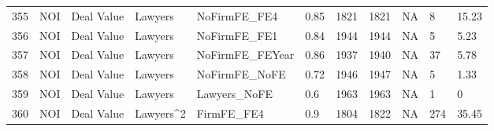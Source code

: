 \documentclass{article}
\begin{document}
\begin{table}[H]
\begin{tabular}{rllllllllll}
  355 & NOI & Deal Value & Lawyers & NoFirmFE\_FE4 & 0.85 & 1821 & 1821 & NA & 8 & 15.23 \\ 
  356 & NOI & Deal Value & Lawyers & NoFirmFE\_FE1 & 0.84 & 1944 & 1944 & NA & 5 & 5.23 \\ 
  357 & NOI & Deal Value & Lawyers & NoFirmFE\_FEYear & 0.86 & 1937 & 1940 & NA & 37 & 5.78 \\ 
  358 & NOI & Deal Value & Lawyers & NoFirmFE\_NoFE & 0.72 & 1946 & 1947 & NA & 5 & 1.33 \\ 
  359 & NOI & Deal Value & Lawyers & Lawyers\_NoFE & 0.6 & 1963 & 1963 & NA & 1 & 0 \\ 
  360 & NOI & Deal Value & Lawyers^2 & FirmFE\_FE4 & 0.9 & 1804 & 1822 & NA & 274 & 35.45 \\ 
   \hline
\end{tabular}
\end{table}
\end{document}
